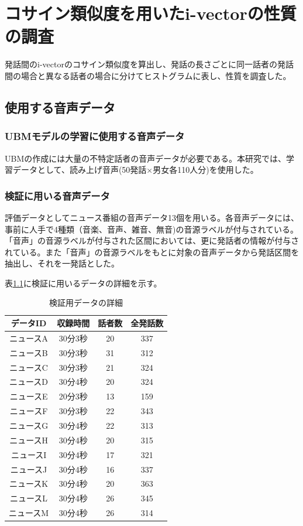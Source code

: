\chapter{コサイン類似度を用いたi-vectorの性質の調査}
発話間のi-vectorのコサイン類似度を算出し、発話の長さごとに同一話者の発話間の場合と異なる話者の場合に分けてヒストグラムに表し、性質を調査した。
\section{使用する音声データ}
\subsection{UBMモデルの学習に使用する音声データ}
UBMの作成には大量の不特定話者の音声データが必要である。本研究では、学習データとして、読み上げ音声\cite{ATR}(50発話×男女各110人分)を使用した。
\subsection{検証に用いる音声データ}
評価データとしてニュース番組の音声データ13個を用いる。各音声データには、事前に人手で4種類（音楽、音声、雑音、無音)の音源ラベルが付与されている。「音声」の音源ラベルが付与された区間においては、更に発話者の情報が付与されている。また「音声」の音源ラベルをもとに対象の音声データから発話区間を抽出し、それを一発話とした。\par
表\ref{val_detail}に検証に用いるデータの詳細を示す。

\begin{table}[htb]
  \begin{center}
  \label{val_detail}
    \caption{検証用データの詳細}
    \begin{tabular}{|c||c|c|c|} \hline
      データID & 収録時間 & 話者数 & 全発話数 \\ \hline
      ニュースA & 30分3秒 & 20 & 337 \\ \hline
      ニュースB & 30分3秒 & 31 & 312\\ \hline
      ニュースC & 30分3秒 & 21 & 324 \\ \hline
      ニュースD & 30分4秒 & 20 & 324\\ \hline
      ニュースE & 20分3秒 & 13 & 159\\ \hline
      ニュースF & 30分3秒 & 22 & 343\\ \hline
      ニュースG & 30分4秒 & 22 & 313\\ \hline
      ニュースH & 30分4秒 & 20 & 315\\ \hline
      ニュースI & 30分4秒 & 17 & 321\\ \hline
      ニュースJ & 30分4秒 & 16 & 337\\ \hline
      ニュースK & 30分4秒 & 20 & 363\\ \hline
      ニュースL & 30分4秒 & 26 & 345\\ \hline
      ニュースM & 30分4秒 & 26 & 314\\ \hline
    \end{tabular}
  \end{center}
\end{table}


